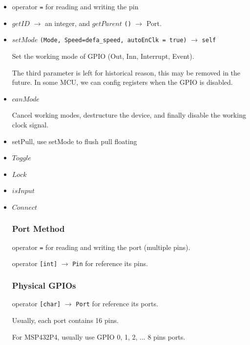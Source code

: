 \begin{itemize}

\item operator \verb|=| for reading and writing the pin

\item $getID$ $\rightarrow$ an integer, and $getParent$ \verb|()| $\rightarrow$ Port.

\item $setMode$ \verb|(Mode, Speed=defa_speed, autoEnClk = true)| $\rightarrow$ \verb|self|

Set the working mode of GPIO (Out, Inn, Interrupt, Event).

The third parameter is left for historical reason, this may be removed in the future. In some MCU, we can config registers when the GPIO is disabled.

\item $canMode$

Cancel working modes, destructure the device, and finally disable the working clock signal.

\item setPull, use setMode to flush pull floating

\item $Toggle$

\item $Lock$

\item $isInput$

\item $Connect$



\subsubsection{Port Method}

operator \verb|=| for reading and writing the port (multiple pins).

operator \verb|[int]| $\rightarrow$ \verb|Pin| for reference its pins.



\subsubsection{Physical GPIOs}

operator \verb|[char]| $\rightarrow$ \verb|Port| for reference its ports.

Usually, each port contains 16 pins.

For MSP432P4, usually use GPIO 0, 1, 2, ... 8 pins ports.


\end{itemize}
